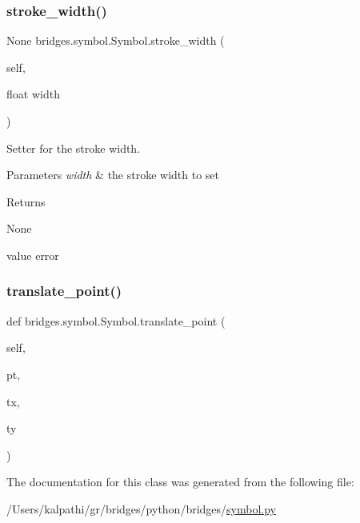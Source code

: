 \subsubsection{\texorpdfstring{stroke\_width()}{stroke\_width()}\hspace{0.1cm}{\footnotesize\ttfamily [2/2]}}
{\footnotesize\ttfamily  None bridges.\+symbol.\+Symbol.\+stroke\+\_\+width (\begin{DoxyParamCaption}\item[{}]{self,  }\item[{float}]{width }\end{DoxyParamCaption})}



Setter for the stroke width. 


\begin{DoxyParams}{Parameters}
{\em width} & the stroke width to set \\
\hline
\end{DoxyParams}
\begin{DoxyReturn}{Returns}


None \begin{DoxyVerb}       value error
\end{DoxyVerb}
 
\end{DoxyReturn}
\mbox{\label{classbridges_1_1symbol_1_1_symbol_a9600a66f48ad38baf42a2043db13334b}} 
\subsubsection{\texorpdfstring{translate\_point()}{translate\_point()}}
{\footnotesize\ttfamily def bridges.\+symbol.\+Symbol.\+translate\+\_\+point (\begin{DoxyParamCaption}\item[{}]{self,  }\item[{}]{pt,  }\item[{}]{tx,  }\item[{}]{ty }\end{DoxyParamCaption})}



The documentation for this class was generated from the following file\+:\begin{DoxyCompactItemize}
\item 
/\+Users/kalpathi/gr/bridges/python/bridges/\mbox{\hyperlink{symbol_8py}{symbol.\+py}}\end{DoxyCompactItemize}
